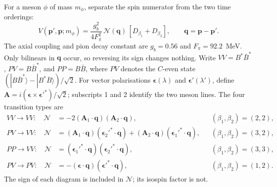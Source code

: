 For a meson $\phi$ of mass $m_\phi$, separate the spin numerator from the
two time orderings:
\begin{equation}
 V(\bm p',\bm p;m_\phi)=\frac{g_b^2}{4F_\pi^2}\,
 \mathcal N(\bm q)\,[D_{\beta_1}+D_{\beta_2}],
 \qquad \bm q=\bm p-\bm p'.
\label{eq:ome-spin-factorisation}
\end{equation}
The axial coupling and pion decay constant are $g_b=0.56$ and
$F_\pi=92.2$~MeV. Only bilinears in $\bm q$ occur, so reversing its sign
changes nothing. Write $VV=B^*\bar B^*$, $PV=B\bar B^*$, and $PP=B\bar B$,
where $PV$ denotes the $C$-even state
$(|B\bar B^*\rangle-|B^*\bar B\rangle)/\sqrt2$.
For vector polarisations $\bm\epsilon(\lambda)$ and
$\bm\epsilon'(\lambda')$, define
$\bm A=i(\bm\epsilon\times\bm\epsilon'^*)/\sqrt2$; subscripts 1 and 2
identify the two meson lines. The four transition types are
\begin{align}
 VV\to VV:\quad \mathcal N&=-2(\bm A_1\cdot\bm q)(\bm A_2\cdot\bm q),
 &&(\beta_1,\beta_2)=(2,2),\label{eq:spin-vv}\\
 PV\to VV:\quad \mathcal N&=(\bm A_1\cdot\bm q)(\bm\epsilon_2'^*\cdot\bm q)
 +(\bm A_2\cdot\bm q)(\bm\epsilon_1'^*\cdot\bm q),
 &&(\beta_1,\beta_2)=(3,2),\label{eq:spin-pvv}\\
 PP\to VV:\quad \mathcal N&=(\bm\epsilon_1'^*\cdot\bm q)(\bm\epsilon_2'^*\cdot\bm q),
 &&(\beta_1,\beta_2)=(3,3),\label{eq:ome-bb-bsbs}\\
 PV\to PV:\quad \mathcal N&=-(\bm\epsilon\cdot\bm q)(\bm\epsilon'^*\cdot\bm q),
 &&(\beta_1,\beta_2)=(1,2).\label{eq:spin-pv}
\end{align}
The sign of each diagram is included in $\mathcal N$; its isospin factor
is not.

